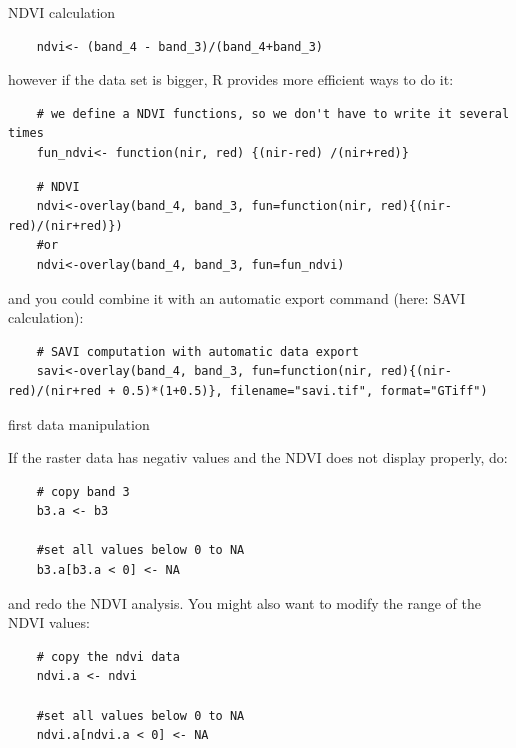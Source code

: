 \begin{frame}[fragile]{NDVI calculation}

    \begin{lstlisting}
	ndvi<- (band_4 - band_3)/(band_4+band_3)
   \end{lstlisting}

\bigskip \pause

however if the data set is bigger, R provides more efficient ways to do it:

\bigskip \pause

 \begin{lstlisting}
	# we define a NDVI functions, so we don't have to write it several times
	fun_ndvi<- function(nir, red) {(nir-red) /(nir+red)} 
   \end{lstlisting}

   \bigskip \pause

 \begin{lstlisting}
	# NDVI
	ndvi<-overlay(band_4, band_3, fun=function(nir, red){(nir-red)/(nir+red)})
	#or
	ndvi<-overlay(band_4, band_3, fun=fun_ndvi)
   \end{lstlisting}

\bigskip \pause and you could combine it with an automatic export command (here: SAVI calculation):

 \begin{lstlisting}
	# SAVI computation with automatic data export
	savi<-overlay(band_4, band_3, fun=function(nir, red){(nir-red)/(nir+red + 0.5)*(1+0.5)}, filename="savi.tif", format="GTiff")
   \end{lstlisting}


\end{frame}


\begin{frame}[fragile]{first data manipulation}

If the raster data has negativ values and the NDVI does not display properly, do:

    \begin{lstlisting}
	# copy band 3
	b3.a <- b3
	
	#set all values below 0 to NA
	b3.a[b3.a < 0] <- NA
   \end{lstlisting}

   \bigskip
   
   and redo the NDVI  analysis.  \pause You might also want to modify the range of the NDVI values:

       \begin{lstlisting}
	# copy the ndvi data
	ndvi.a <- ndvi
	
	#set all values below 0 to NA
	ndvi.a[ndvi.a < 0] <- NA
	\end{lstlisting}
   
\end{frame}

